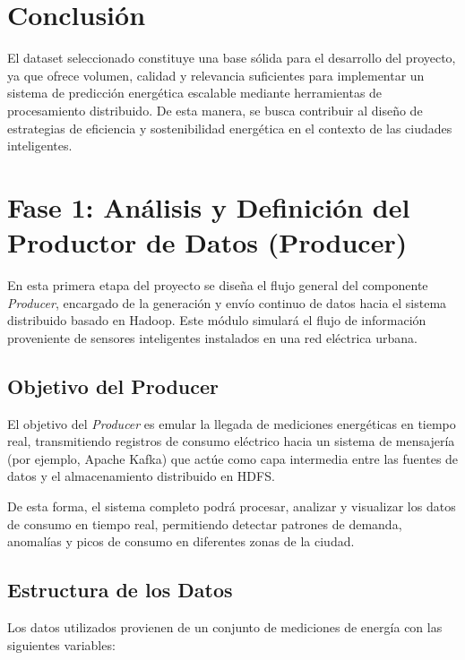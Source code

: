 \documentclass[12pt,a4paper]{article}
\begin{document}
\section*{Conclusión}
El dataset seleccionado constituye una base sólida para el desarrollo del proyecto, ya que ofrece volumen, calidad y relevancia suficientes para implementar un sistema de predicción energética escalable mediante herramientas de procesamiento distribuido.  
De esta manera, se busca contribuir al diseño de estrategias de eficiencia y sostenibilidad energética en el contexto de las ciudades inteligentes.

\section{Fase 1: Análisis y Definición del Productor de Datos (Producer)}

En esta primera etapa del proyecto se diseña el flujo general del componente \textit{Producer}, encargado de la generación y envío continuo de datos hacia el sistema distribuido basado en Hadoop. Este módulo simulará el flujo de información proveniente de sensores inteligentes instalados en una red eléctrica urbana.

\subsection{Objetivo del Producer}
El objetivo del \textit{Producer} es emular la llegada de mediciones energéticas en tiempo real, transmitiendo registros de consumo eléctrico hacia un sistema de mensajería (por ejemplo, Apache Kafka) que actúe como capa intermedia entre las fuentes de datos y el almacenamiento distribuido en HDFS.

De esta forma, el sistema completo podrá procesar, analizar y visualizar los datos de consumo en tiempo real, permitiendo detectar patrones de demanda, anomalías y picos de consumo en diferentes zonas de la ciudad.

\subsection{Estructura de los Datos}
Los datos utilizados provienen de un conjunto de mediciones de energía con las siguientes variables:
\end{document}
